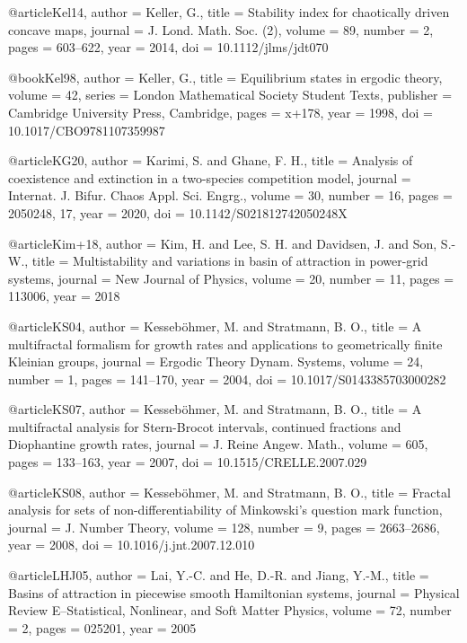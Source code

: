 @article{Kel14,
  author = {Keller, G.},
  title = {Stability index for chaotically driven concave maps},
  journal = {J. Lond. Math. Soc. (2)},
  volume = {89},
  number = {2},
  pages = {603--622},
  year = {2014},
  doi = {10.1112/jlms/jdt070}
}

@book{Kel98,
  author = {Keller, G.},
  title = {Equilibrium states in ergodic theory},
  volume = {42},
  series = {London Mathematical Society Student Texts},
  publisher = {Cambridge University Press, Cambridge},
  pages = {x+178},
  year = {1998},
  doi = {10.1017/CBO9781107359987}
}

@article{KG20,
  author = {Karimi, S. and Ghane, F. H.},
  title = {Analysis of coexistence and extinction in a two-species competition model},
  journal = {Internat. J. Bifur. Chaos Appl. Sci. Engrg.},
  volume = {30},
  number = {16},
  pages = {2050248, 17},
  year = {2020},
  doi = {10.1142/S021812742050248X}
}

@article{Kim+18,
  author = {Kim, H. and Lee, S. H. and Davidsen, J. and Son, S.-W.},
  title = {Multistability and variations in basin of attraction in power-grid systems},
  journal = {New Journal of Physics},
  volume = {20},
  number = {11},
  pages = {113006},
  year = {2018}
}

@article{KS04,
  author = {Kesseb{\"o}hmer, M. and Stratmann, B. O.},
  title = {A multifractal formalism for growth rates and applications to geometrically finite Kleinian groups},
  journal = {Ergodic Theory Dynam. Systems},
  volume = {24},
  number = {1},
  pages = {141--170},
  year = {2004},
  doi = {10.1017/S0143385703000282}
}

@article{KS07,
  author = {Kesseb{\"o}hmer, M. and Stratmann, B. O.},
  title = {A multifractal analysis for Stern-Brocot intervals, continued fractions and Diophantine growth rates},
  journal = {J. Reine Angew. Math.},
  volume = {605},
  pages = {133--163},
  year = {2007},
  doi = {10.1515/CRELLE.2007.029}
}

@article{KS08,
  author = {Kesseb{\"o}hmer, M. and Stratmann, B. O.},
  title = {Fractal analysis for sets of non-differentiability of Minkowski’s question mark function},
  journal = {J. Number Theory},
  volume = {128},
  number = {9},
  pages = {2663--2686},
  year = {2008},
  doi = {10.1016/j.jnt.2007.12.010}
}

@article{LHJ05,
  author = {Lai, Y.-C. and He, D.-R. and Jiang, Y.-M.},
  title = {Basins of attraction in piecewise smooth Hamiltonian systems},
  journal = {Physical Review E–Statistical, Nonlinear, and Soft Matter Physics},
  volume = {72},
  number = {2},
  pages = {025201},
  year = {2005}
}

